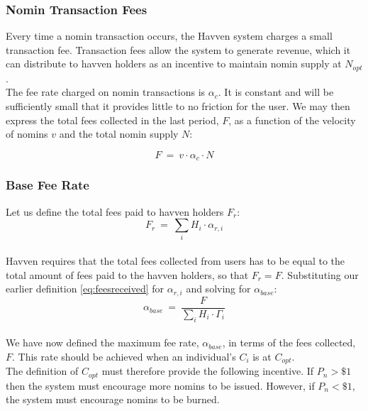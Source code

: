 \newpage

\subsubsection{Nomin Transaction Fees}
Every time a nomin transaction occurs, the Havven system charges a small
transaction fee. Transaction fees allow the system to generate revenue, which
it can distribute to havven holders as an incentive to maintain nomin supply
at $N_{opt}$. \\

\noindent The fee rate charged on nomin transactions is $\alpha_c$. It is
constant and will be sufficiently small that it provides little to no
friction for the user. We may then express the total fees collected in the
last period, $F$, as a function of the velocity of nomins $v$ and the total
nomin supply $N$:

\begin{equation}
    F \ = \ v \cdot \alpha_c \cdot N
\end{equation}

\subsubsection{Base Fee Rate}

Let us define the total fees paid to havven holders $F_{r}$: \\

\begin{equation}
F_{r} \ = \ \sum_{i} H_{i} \cdot \alpha_{r,i} \label{eq:totalfeesreceived}
\end{equation} \\

\noindent Havven requires that the total fees collected from users has to be
equal to the total amount of fees paid to the havven holders, so that $F_{r}
= F$. Substituting our earlier definition \eqref{eq:feesreceived} for
$\alpha_{r,i}$ and solving for $\alpha_{base} $: \\

\begin{equation}
\alpha_{base} \ = \ \frac{F}{\sum_{i} H_{i} \cdot \mathit{\Gamma}_{i}} \label{eq:alphabase}
\end{equation} \\

\noindent We have now defined the maximum fee rate, $\alpha_{base}$, in terms
of the fees collected, $F$. This rate should be achieved when an individual's
$C_i$ is at $C_{opt}$. \\

\noindent The definition of $C_{opt}$ must therefore provide the following
incentive. If $P_n > \$1$ then the system must encourage more nomins to be
issued. However, if $P_n < \$1$, the system must encourage nomins to be
burned.

